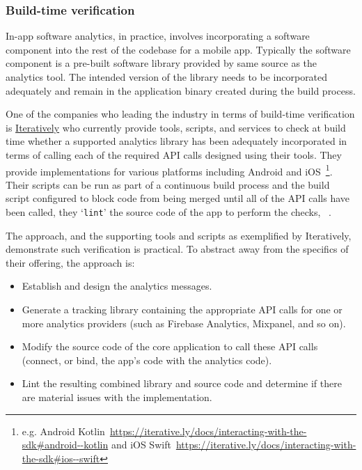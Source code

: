 \subsubsection{Build-time verification} 
In-app software analytics, in practice, involves incorporating a software component into the rest of the codebase for a mobile app. Typically the software component is a pre-built software library provided by same source as the analytics tool. The intended version of the library needs to be incorporated adequately and remain in the application binary created during the build process.

One of the companies who leading the industry in terms of build-time verification is \href{https://iterative.ly}{Iteratively} who currently provide tools, scripts, and services to check at build time whether a supported analytics library has been adequately incorporated in terms of calling each of the required API calls designed using their tools. They provide implementations for various platforms including Android and iOS~\footnote{e.g. Android Kotlin~\url{https://iterative.ly/docs/interacting-with-the-sdk\#android--kotlin} and iOS Swift~\url{https://iterative.ly/docs/interacting-with-the-sdk\#ios--swift}}. Their scripts can be run as part of a continuous build process and the build script configured to block code from being merged until all of the API calls have been called, they `\texttt{lint}' the source code of the app to perform the checks, ~\cite{using_the_itly_cli_verify_the_instrumentation, using_the_itly_cli_itly_verify}.

The approach, and the supporting tools and scripts as exemplified by Iteratively, demonstrate such verification is practical. To abstract away from the specifics of their offering, the approach is:
\begin{itemize}
    \item Establish and design the analytics messages.
    \item Generate a tracking library containing the appropriate API calls for one or more analytics providers (such as Firebase Analytics, Mixpanel, and so on).
    \item Modify the source code of the core application to call these API calls (connect, or bind, the app's code with the analytics code).
    \item Lint the resulting combined library and source code and determine if there are material issues with the implementation.
\end{itemize}

